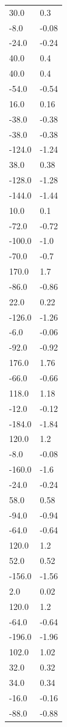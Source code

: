\begin{longtable}{ll}
30.0 & 0.3 \\
-8.0 & -0.08 \\
-24.0 & -0.24 \\
40.0 & 0.4 \\
40.0 & 0.4 \\
-54.0 & -0.54 \\
16.0 & 0.16 \\
-38.0 & -0.38 \\
-38.0 & -0.38 \\
-124.0 & -1.24 \\
38.0 & 0.38 \\
-128.0 & -1.28 \\
-144.0 & -1.44 \\
10.0 & 0.1 \\
-72.0 & -0.72 \\
-100.0 & -1.0 \\
-70.0 & -0.7 \\
170.0 & 1.7 \\
-86.0 & -0.86 \\
22.0 & 0.22 \\
-126.0 & -1.26 \\
-6.0 & -0.06 \\
-92.0 & -0.92 \\
176.0 & 1.76 \\
-66.0 & -0.66 \\
118.0 & 1.18 \\
-12.0 & -0.12 \\
-184.0 & -1.84 \\
120.0 & 1.2 \\
-8.0 & -0.08 \\
-160.0 & -1.6 \\
-24.0 & -0.24 \\
58.0 & 0.58 \\
-94.0 & -0.94 \\
-64.0 & -0.64 \\
120.0 & 1.2 \\
52.0 & 0.52 \\
-156.0 & -1.56 \\
2.0 & 0.02 \\
120.0 & 1.2 \\
-64.0 & -0.64 \\
-196.0 & -1.96 \\
102.0 & 1.02 \\
32.0 & 0.32 \\
34.0 & 0.34 \\
-16.0 & -0.16 \\
-88.0 & -0.88 \\

\end{longtable}
